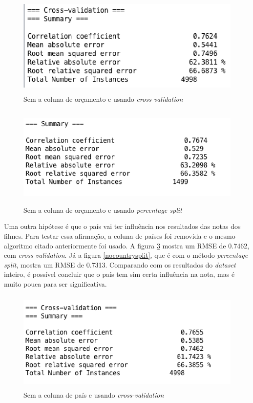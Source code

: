 \begin{figure}[H]
\centering
\includegraphics[height=5cm]{imagens/no_budget_cv.png}
\caption{Sem a coluna de orçamento e usando \textit{cross-validation}}
\label{nobudgetcv}
\end{figure}

\begin{figure}[H]
\centering
\includegraphics[height=5cm]{imagens/no_budget_split.png}
\caption{Sem a coluna de orçamento e usando \textit{percentage split}}
\label{nobudgetsplit}
\end{figure}


Uma outra hipótese é que o país vai ter influência nos resultados das notas dos filmes. Para testar essa afirmação, a coluna de países foi removida e o mesmo algoritmo citado anteriormente foi usado. A figura \ref{nocountrycv} mostra um RMSE de 0.7462, com \textit{cross validation}. Já a figura \ref{nocountrysplit}, que é com o método \textit{percentage split}, mostra um RMSE de 0.7313. Comparando com os resultados do \textit{dataset} inteiro, é possível concluir que o país tem sim certa influência na nota, mas é muito pouca para ser significativa. 

\begin{figure}[H]
\centering
\includegraphics[height=5cm]{imagens/no_country_cv.png}
\caption{Sem a coluna de país e usando \textit{cross-validation}}
\label{nocountrycv}
\end{figure}

